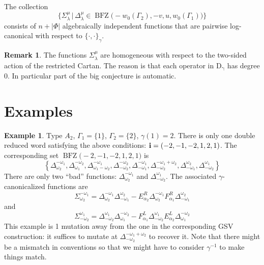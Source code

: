 \documentclass[a4paper]{amsart}
\theoremstyle{definition}
\newtheorem{remark}[theorem]{Remark}
\newtheorem{example}[theorem]{Example}
\begin{document}
\begin{claim}
  The collection
  \[
    \Big\{
      \Sigma_\lambda^\mu\,\big|\, \Delta_\lambda^\mu\in \operatorname{BFZ}\big(-w_0(\Gamma_2),-v,u,w_0(\Gamma_1)\big)
    \Big\}
  \]
  consists of $n+|\Phi|$ algebraically independent functions that are pairwise log-canonical with respect to $\{\cdot,\cdot\}_\gamma$.
\end{claim}

\begin{remark}
  The functions $\Sigma_\lambda^\mu$ are homogeneous with respect to the two-sided action of the restricted Cartan.
  The reason is that each operator in $\operatorname{D_\gamma}$ has degree 0.
  In particular part of the big conjecture is automatic.
\end{remark}

\section{Examples}
\begin{example}
  Type $A_2$, $\Gamma_1=\{1\}$, $\Gamma_2=\{2\}$, $\gamma(1)=2$.
  There is only one double reduced word satisfying the above conditions: ${\bf i}=(-2, -1, -2, 1, 2, 1)$.
  The corresponding set $\operatorname{BFZ}\big(-2, -1, -2, 1, 2, 1\big)$ is 
  \[
    \left\{
    \Delta_{\omega_{2}}^{-\omega_{1}},
    \Delta_{\omega_{1}}^{-\omega_{2}},
    \Delta_{\omega_{1} - \omega_{2}}^{-\omega_{1}},
    \Delta_{-\omega_{2}}^{-\omega_{2}},
    \Delta_{-\omega_{1}}^{-\omega_{1}}, 
    \Delta_{-\omega_{2}}^{-\omega_{1} + \omega_{2}},
    \Delta_{-\omega_{1}}^{\omega_{2}},
    \Delta_{-\omega_{2}}^{\omega_{1}}
    \right\}
  \]
  There are only two ``bad'' functions: $\Delta_{\omega_{2}}^{-\omega_{1}}$ and $\Delta_{-\omega_{2}}^{\omega_{1}}$.
  The associated $\gamma$-canonicalized functions are
  \[
    \Sigma_{\omega_{2}}^{-\omega_{1}}=
    \Delta_{\omega_{2}}^{-\omega_{1}}\Delta_{-\omega_1}^{\omega_2} - E_{\alpha_2}^R\Delta_{\omega_{2}}^{-\omega_{1}} F_{\alpha_1}^R\Delta_{-\omega_1}^{\omega_2}
  \]
  and
  \[
    \Sigma_{-\omega_{2}}^{\omega_{1}}=
    \Delta_{-\omega_{2}}^{\omega_{1}}\Delta_{\omega_1}^{-\omega_2} - F_{\alpha_1}^L\Delta_{-\omega_{2}}^{\omega_{1}}E_{\alpha_2}^L\Delta_{\omega_1}^{-\omega_2}
  \]
  This example is 1 mutation away from the one in the corresponding GSV construction: it suffices to mutate at $\Delta_{-\omega_{2}}^{-\omega_{1} + \omega_{2}}$ to recover it.
  Note that there might be a mismatch in conventions so that we might have to consider $\gamma^{-1}$ to make things match.
\end{example}
\end{document}
